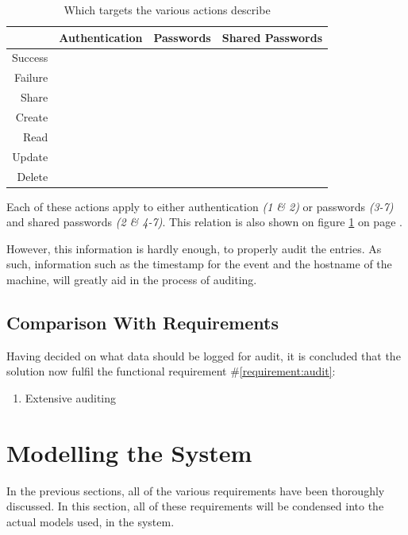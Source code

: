 		\begin{table}
			\begin{tabular}{r | c | c | c }
							& \textbf{Authentication} 		& \textbf{Passwords} 		& \textbf{Shared Passwords} 	\\
				\hline
				Success 	& \cmark 						& \xmark 					& \xmark 						\\
				Failure 	& \cmark 						& \xmark 					& \xmark 						\\
				Share 		& \xmark 						& \xmark 					& \cmark 						\\
				Create 		& \xmark 						& \cmark 					& \xmark 						\\
				Read 		& \xmark 						& \cmark 					& \cmark 						\\
				Update 		& \xmark 						& \cmark 					& \cmark 						\\
				Delete 		& \xmark 						& \cmark 					& \cmark 						\\
			\end{tabular}
			\caption{Which targets the various actions describe}
			\label{table:actions}
		\end{table}

		Each of these actions apply to either authentication \emph{(1 \& 2)} or passwords \emph{(3-7)} and shared passwords \emph{(2 \& 4-7)}. This relation is also shown on figure \ref{table:actions} on page \pageref{table:actions}.
		
		However, this information is hardly enough, to properly audit the entries. As such, information such as the timestamp for the event and the hostname of the machine, will greatly aid in the process of auditing. 

		\subsection{Comparison With Requirements}
			\label{requirement:fulfilled:audit}
			Having decided on what data should be logged for audit, it is concluded that the solution now fulfil the functional requirement \#\ref{requirement:audit}:
			\vspace{-3ex}\begin{enumerate}
				\setlength\itemsep{0.1em}
				\setcounter{enumi}{13-1}
				\item Extensive auditing
			\end{enumerate}

	\section{Modelling the System}
		\label{sec:modelling}
		In the previous sections, all of the various requirements have been thoroughly discussed. In this section, all of these requirements will be condensed into the actual models used, in the system. 

